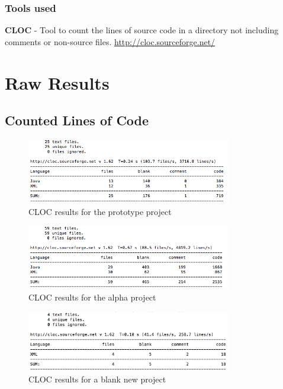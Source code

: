 \documentclass[11pt,english,numbers=endperiod,parskip=half,abstract=on]{scrreprt}
\begin{document}
  \subsection{Tools used}
  \raggedright
  \textbf{CLOC} - Tool to count the lines of source code in a directory not
  including comments or non-source files. \url{http://cloc.sourceforge.net/}
\appendix
\chapter{Raw Results}
\section{Counted Lines of Code}
\begin{figure}[H]
  \centering
  \includegraphics[width=0.8\textwidth]{images/cloc-proto.png}
  \caption{CLOC results for the prototype project}
\end{figure}
\begin{figure}[H]
  \centering
  \includegraphics[width=0.8\textwidth]{images/cloc-alpha.png}
  \caption{CLOC results for the alpha project}
\end{figure}
\begin{figure}[H]
  \centering
  \includegraphics[width=0.8\textwidth]{images/cloc-blank.png}
  \caption{CLOC results for a blank new project}
\end{figure}
\end{document}
